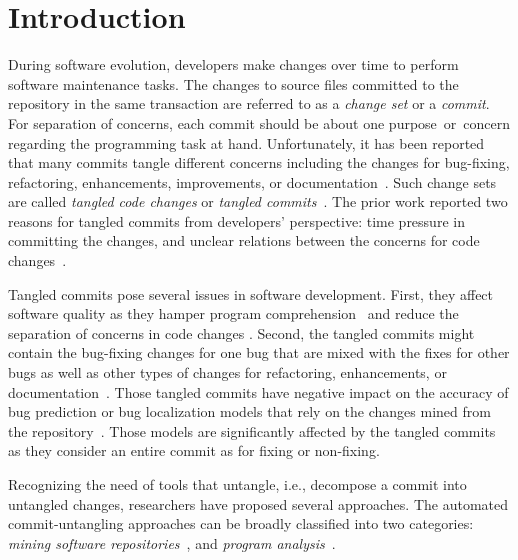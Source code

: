 \section{Introduction}
\label{intro:sec}

During software evolution, developers make changes over time
to perform software maintenance tasks.
The changes to source files committed to the repository in the same transaction are referred to as a {\em change set} or a {\em commit}.
For separation of concerns, each commit should be about one
purpose~or~concern regarding the programming task at hand.
Unfortunately, it has been reported that many commits tangle different  concerns including the changes for bug-fixing, refactoring,
enhancements, improvements, or
documentation~\cite{tao-fse12,kim-emse16,kim-msr13,hill-tse12,nguyen-issre13}.
Such change sets are called {\em tangled code changes} or {\em tangled
  commits}~\cite{kim-emse16,kim-msr13}. The prior work reported two
reasons for tangled commits from developers' perspective: time
pressure in committing the changes, and unclear relations between the
concerns for code changes~\cite{flexeme-fse20}.

Tangled commits pose several issues in software development. First,
they affect software quality as they hamper program
comprehension~\cite{tao-fse12} and reduce the separation of concerns
in code changes \cite{flexeme-fse20}. Second, the tangled commits
might contain the bug-fixing changes for one bug that are mixed with
the fixes for other bugs as well as other types of changes for
refactoring, enhancements, or
documentation~\cite{kim-emse16,kim-msr13,nguyen-issre13}. Those
tangled commits have negative impact on the accuracy of bug prediction
or bug localization models that rely on the changes mined from the
repository~\cite{kim-emse16,kim-msr13}. Those models are
significantly affected by the tangled commits as they consider an
entire commit as for fixing or non-fixing.



Recognizing the need of tools that untangle, i.e., decompose a commit
into untangled changes, researchers have proposed several
approaches. The automated commit-untangling approaches can be broadly
classified into two categories: {\em mining software
  repositories}~\cite{kim-msr13,kim-emse16,higo-apsec16,
  higo-icpc14,dias-saner15}, and {\em program
  analysis}~\cite{roover-scam18,barnett-icse15,flexeme-fse20,smartcommit-fse21}.

